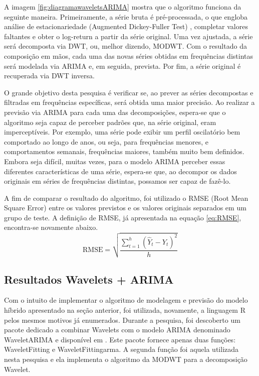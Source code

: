 \documentclass[12pt]{article}
\begin{document}
	A imagem \ref{fig:diagramawaveletsARIMA} mostra que o algoritmo funciona da seguinte maneira. Primeiramente, a série bruta é pré-processada, o que engloba análise de estacionariedade \textrm{(Augmented Dickey-Fuller Test)} \cite{Tsay}, completar valores faltantes e obter o \textrm{log-return} a partir da série original. Uma vez ajustada, a série será decomposta via \textrm{DWT}, ou, melhor dizendo, \textrm{MODWT}. Com o resultado da composição em mãos, cada uma das novas séries obtidas em frequências distintas será modelada via ARIMA e, em seguida, prevista. Por fim, a série original é recuperada via \textrm{DWT} inversa.
	
	O grande objetivo desta pesquisa é verificar se, ao prever as séries decompostas e filtradas em frequências específicas, será obtida uma maior precisão. Ao realizar a previsão via ARIMA para cada uma das decomposições, espera-se que o algoritmo seja capaz de perceber padrões que, na série original, eram imperceptíveis. Por exemplo, uma série pode exibir um perfil oscilatório bem comportado ao longo de anos, ou seja, para frequências menores, e comportamentos semanais, frequências maiores, também muito bem definidos. Embora seja difícil, muitas vezes, para o modelo ARIMA perceber essas diferentes características de uma série, espera-se que, ao decompor os dados originais em séries de frequências distintas, possamos ser capaz de fazê-lo.
	
	A fim de comparar o resultado do algoritmo, foi utilizado o \textrm{RMSE} \textrm{(Root Mean Square Error)} entre os valores previstos e os valores originais separados em um grupo de teste. A definição de \textrm{RMSE}, já apresentada na equação \ref{eq:RMSE}, encontra-se novamente abaixo.
	\begin{equation*}
			\textrm{RMSE} = \sqrt{\dfrac{\sum_{t=1}^{h}(\hat{Y}_t-Y_t)^2}{h}}
	\end{equation*}
	
	\subsection{Resultados Wavelets + ARIMA}\label{sec:resultadosWave}
	
	Com o intuito de implementar o algoritmo de modelagem e previsão do modelo híbrido apresentado na seção anterior, foi utilizada, novamente, a linguagem R pelos mesmos motivos já enumerados. Durante a pesquisa, foi descoberto um pacote dedicado a combinar \textrm{Wavelets} com o modelo ARIMA denominado \textrm{WaveletARIMA} e disponível em \cite{CRANR}. Este pacote fornece apenas duas funções: \textrm{WaveletFitting} e \textrm{WaveletFittingarma}. A segunda função foi aquela utilizada nesta pesquisa e ela implementa o algoritmo da MODWT para a decomposição \textrm{Wavelet}.
	
\end{document}
